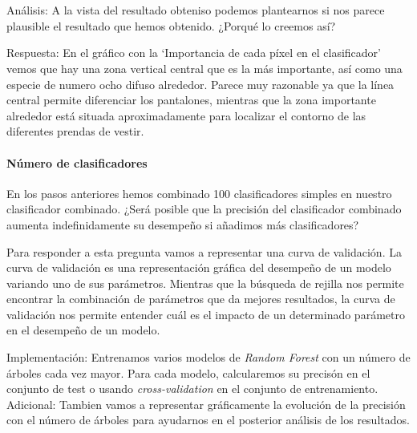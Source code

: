 \documentclass[11pt]{article}
\begin{document}
    \begin{center}
    \end{center}
    { \hspace*{\fill} \\}
    
    \begin{center}
    \end{center}
    { \hspace*{\fill} \\}
    
    Análisis: A la vista del resultado obteniso podemos plantearnos si nos
parece plausible el resultado que hemos obtenido. ¿Porqué lo creemos
así?

    Respuesta: En el gráfico con la `Importancia de cada píxel en el
clasificador' vemos que hay una zona vertical central que es la más
importante, así como una especie de numero ocho difuso alrededor. Parece
muy razonable ya que la línea central permite diferenciar los
pantalones, mientras que la zona importante alrededor está situada
aproximadamente para localizar el contorno de las diferentes prendas de
vestir.

    \hypertarget{nuxfamero-de-clasificadores}{%
\paragraph{Número de clasificadores}\label{nuxfamero-de-clasificadores}}

    En los pasos anteriores hemos combinado 100 clasificadores simples en
nuestro clasificador combinado. ¿Será posible que la precisión del
clasificador combinado aumenta indefinidamente su desempeño si añadimos
más clasificadores?

Para responder a esta pregunta vamos a representar una curva de
validación. La curva de validación es una representación gráfica del
desempeño de un modelo variando uno de sus parámetros. Mientras que la
búsqueda de rejilla nos permite encontrar la combinación de parámetros
que da mejores resultados, la curva de validación nos permite entender
cuál es el impacto de un determinado parámetro en el desempeño de un
modelo.

    Implementación: Entrenamos varios modelos de \emph{Random Forest} con un
número de árboles cada vez mayor. Para cada modelo, calcularemos su
precisón en el conjunto de test o usando \emph{cross-validation} en el
conjunto de entrenamiento. Adicional: Tambien vamos a representar
gráficamente la evolución de la precisión con el número de árboles para
ayudarnos en el posterior análisis de los resultados.
\end{document}
